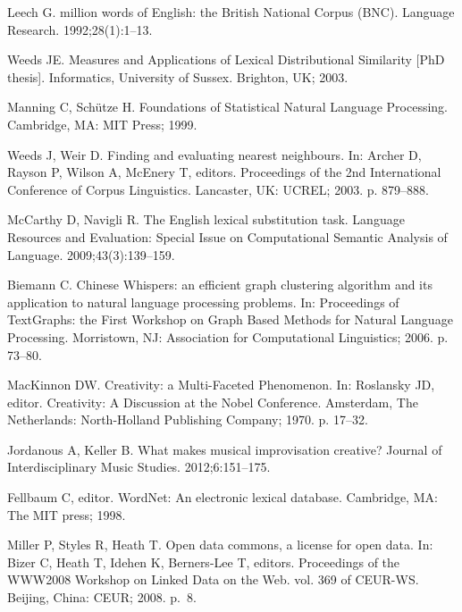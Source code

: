\documentclass[10pt,letterpaper]{article}
\begin{document}
\begin{thebibliography}{10}
Leech G.
 million words of {English}: the {British National Corpus (BNC)}.
\newblock Language Research. 1992;28(1):1--13.

Weeds JE.
\newblock Measures and Applications of Lexical Distributional Similarity [PhD
  thesis].
\newblock Informatics, University of Sussex. Brighton, UK; 2003.

Manning C, Sch{\"u}tze H.
\newblock Foundations of Statistical Natural Language Processing.
\newblock Cambridge, MA: MIT Press; 1999.

Weeds J, Weir D.
\newblock Finding and evaluating nearest neighbours.
\newblock In: Archer D, Rayson P, Wilson A, McEnery T, editors. Proceedings of
  the 2nd International Conference of Corpus Linguistics. Lancaster, UK: UCREL;
  2003. p. 879--888.

McCarthy D, Navigli R.
\newblock The {English} lexical substitution task.
\newblock Language Resources and Evaluation: Special Issue on Computational
  Semantic Analysis of Language. 2009;43(3):139--159.

Biemann C.
\newblock Chinese {Whispers}: an efficient graph clustering algorithm and its
  application to natural language processing problems.
\newblock In: Proceedings of TextGraphs: the First Workshop on Graph Based
  Methods for Natural Language Processing. Morristown, NJ: Association for
  Computational Linguistics; 2006. p. 73--80.

MacKinnon DW.
\newblock Creativity: a Multi-Faceted Phenomenon.
\newblock In: Roslansky JD, editor. Creativity: A Discussion at the Nobel
  Conference. Amsterdam, The Netherlands: North-Holland Publishing Company;
  1970. p. 17--32.

Jordanous A, Keller B.
\newblock What makes musical improvisation creative?
\newblock Journal of Interdisciplinary Music Studies. 2012;6:151--175.

Fellbaum C, editor.
\newblock WordNet: An electronic lexical database.
\newblock Cambridge, MA: The MIT press; 1998.

Miller P, Styles R, Heath T.
\newblock Open data commons, a license for open data.
\newblock In: Bizer C, Heath T, Idehen K, Berners-Lee T, editors. Proceedings
  of the WWW2008 Workshop on Linked Data on the Web. vol. 369 of CEUR-WS.
  Beijing, China: CEUR; 2008. p.~8.


\end{thebibliography}
\end{document}
